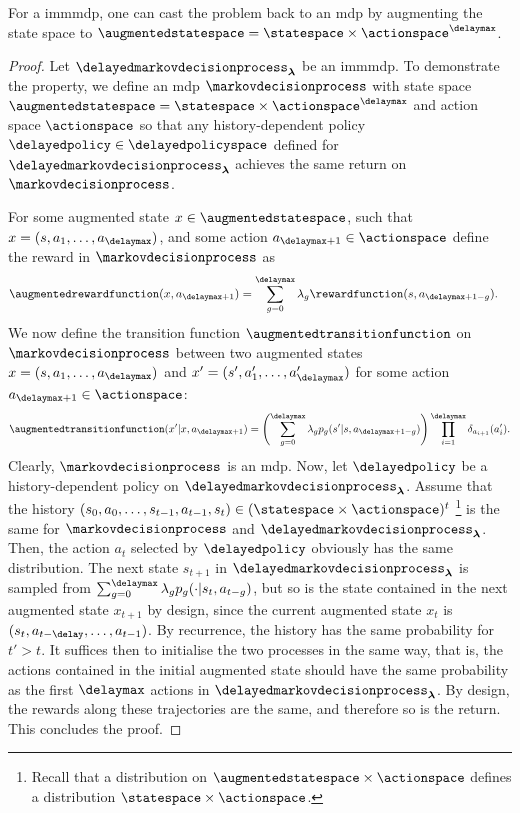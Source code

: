 \begin{prop}
\label{prop:equ_mdp_im_mtdmdp}
    For a \gls{immmdp}, one can cast the problem back to an \gls{mdp} by augmenting the state space to $\augmentedstatespace=\statespace\times\actionspace^\delaymax$.
\end{prop}
\begin{proof}
    Let $\delayedmarkovdecisionprocess_{\boldsymbol\lambda}$ be an \gls{immmdp}.
    To demonstrate the property, we define an \gls{mdp} $\markovdecisionprocess$ with state space $\augmentedstatespace=\statespace\times\actionspace^\delaymax$ and action space $\actionspace$ so that any history-dependent policy $\delayedpolicy\in\delayedpolicyspace$ defined for $\delayedmarkovdecisionprocess_{\boldsymbol\lambda}$ achieves the same return on $\markovdecisionprocess$.
    
    For some augmented state $x\in\augmentedstatespace$, such that $x=(s,a_1,\dots,a_{\delaymax})$, and some action $a_{\delaymax+1}\in\actionspace$ define the reward in $\markovdecisionprocess$ as 
    \begin{align*}
        \augmentedrewardfunction(x,a_{\delaymax+1}) &=\sum_{g=0}^{\delaymax} \lambda_{g} \rewardfunction(s,a_{\delaymax+1-g}).
    \end{align*}
    We now define the transition function $\augmentedtransitionfunction$ on $\markovdecisionprocess$ between two augmented states $x=(s,a_1,\dots,a_{\delaymax})$ and $x'=(s',a_1',\dots,a_{\delaymax}')$ for some action $a_{\delaymax+1}\in\actionspace$:
    \begin{align*}
        \augmentedtransitionfunction(x'\vert x,a_{\delaymax+1}) = \left(\sum_{g=0}^{\delaymax}\lambda_g p_{g}(s'\vert s,a_{\delaymax+1-g})\right)\prod_{i=1}^{\delaymax}\delta_{a_{i+1}}(a_{i}').
    \end{align*}
    Clearly, $\markovdecisionprocess$ is an \gls{mdp}. 
    Now, let $\delayedpolicy$ be a history-dependent policy on $\delayedmarkovdecisionprocess_{\boldsymbol\lambda}$. Assume that the history $(s_0,a_0,\dots,s_{t-1},a_{t-1},s_t)\in(\statespace\times\actionspace)^t$ \footnote{Recall that a distribution on $\augmentedstatespace\times\actionspace$ defines a distribution $\statespace\times\actionspace$.} is the same for $\markovdecisionprocess$ and $\delayedmarkovdecisionprocess_{\boldsymbol\lambda}$.
    Then, the action $a_t$ selected by $\delayedpolicy$ obviously has the same distribution. 
    The next state $s_{t+1}$ in $\delayedmarkovdecisionprocess_{\boldsymbol\lambda}$ is sampled from $\textstyle\sum_{g=0}^{\delaymax}\lambda_g p_g(\cdot\vert s_t,a_{t-g})$, but so is the state contained in the next augmented state $x_{t+1}$ by design, since the current augmented state $x_t$ is $(s_t,a_{t-\delay},\dots,a_{t-1})$.
    By recurrence, the history has the same probability for $t'>t$.
    It suffices then to initialise the two processes in the same way, that is, the actions contained in the initial augmented state should have the same probability as the first $\delaymax$ actions in $\delayedmarkovdecisionprocess_{\boldsymbol\lambda}$.
    By design, the rewards along these trajectories are the same, and therefore so is the return.
    This concludes the proof.
\end{proof}


